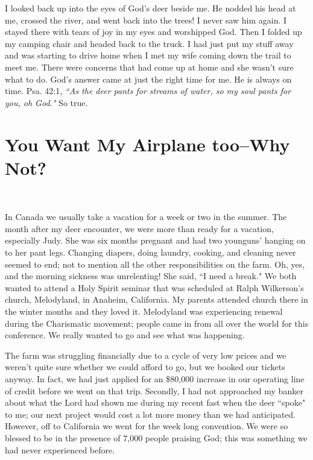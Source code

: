 \documentclass[oneside]{book}
\begin{document}
I looked back up into the eyes of God's deer beside me. He nodded his head at me, crossed the river, and went back into the trees! I never saw him again. I stayed there with tears of joy in my eyes and worshipped God. Then I folded up my camping chair and headed back to the truck. I had just put my stuff away and was starting to drive home when I met my wife coming down the trail to meet me. There were concerns that had come up at home and she wasn't sure what to do. God's answer came at just the right time for me. He is always on time. Psa. 42:1, \textit{``As the deer pants for streams of water, so my soul pants for you, oh God."} So true.


\section{You Want My Airplane too--Why Not?}
\

In Canada we usually take a  vacation for a week or two in the summer. The month after my deer encounter, we were more than ready for a vacation, especially Judy. She was six months pregnant and had two younguns' hanging on to her pant legs. Changing diapers, doing laundry, cooking, and cleaning never seemed to end; not to mention all the other responsibilities on the farm. Oh, yes, and the morning sickness was unrelenting! She said, ``I need a break." We both wanted to attend a Holy Spirit seminar that was scheduled at Ralph Wilkerson's church, Melodyland, in Anaheim, California. My parents attended church there in the winter months and they loved it. Melodyland was experiencing renewal during the Charismatic movement; people came in from all over the world for this conference. We really wanted to go and see what was happening. 

The farm was struggling financially due to a cycle of very low prices and we weren't quite sure whether we could afford to go, but we booked our tickets anyway. In fact, we had just applied for an \$80,000 increase in our operating line of credit before we went on that trip. Secondly, I had not approached my banker about what the Lord had shown me during my recent fast when the deer ``spoke" to me; our next project would cost a lot more money than we had anticipated. However, off to California we went for the week long convention. We were so blessed to be in the presence of 7,000 people praising God; this was something we had never experienced before.
\end{document}
